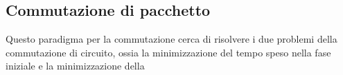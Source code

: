 \subsection{Commutazione di pacchetto}
Questo paradigma per la commutazione cerca di risolvere i due problemi della commutazione di
circuito, ossia la minimizzazione del tempo speso nella fase iniziale e la minimizzazione della

